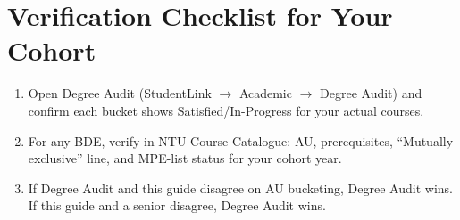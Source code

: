 \section*{Verification Checklist for Your Cohort}
\begin{enumerate}[label=\arabic*.]
    \item Open Degree Audit (StudentLink $\to$ Academic $\to$ Degree Audit) and confirm each bucket shows Satisfied/In-Progress for your actual courses.
    \item For any BDE, verify in NTU Course Catalogue: AU, prerequisites, ``Mutually exclusive'' line, and MPE-list status for your cohort year.
    \item If Degree Audit and this guide disagree on AU bucketing, Degree Audit wins. If this guide and a senior disagree, Degree Audit wins.
\end{enumerate}

